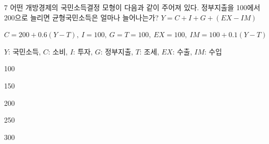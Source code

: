 \begin{question}{7}
어떤 개방경제의 국민소득결정 모형이 다음과 같이 주어져 있다. 정부지출을 100에서 200으로 늘리면 균형국민소득은 얼마나 늘어나는가?
\medskip $Y = C + I + G + (EX - IM)$ \par
$C = 200 + 0.6(Y - T),~I = 100,~G = T = 100,~EX = 100,~IM = 100 + 0.1(Y - T)$ \par
\smallskip $Y$: 국민소득, $C$: 소비, $I$: 투자, $G$: 정부지출, $T$: 조세, $EX$: 수출, $IM$: 수입 \par
\begin{choices}
  \item 100
  \item 150
  \item 200
  \item 250
  \item 300
\end{choices}
\end{question}

